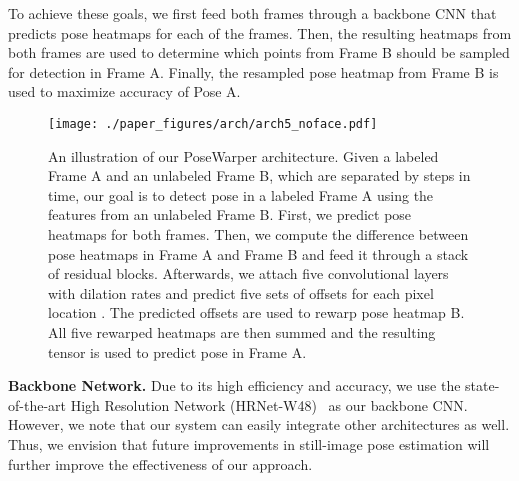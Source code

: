 \documentclass{article}
\begin{document}
To achieve these goals, we first feed both frames through a backbone CNN that predicts pose heatmaps for each of the frames. Then, the resulting heatmaps from both frames are used to determine which points from Frame B should be sampled for detection in Frame A. Finally, the resampled pose heatmap from Frame B is used to maximize accuracy of Pose A. 

















\begin{figure}
\begin{center}
   \texttt{[image: ./paper\_figures/arch/arch5\_noface.pdf]}
\end{center}
\vspace{-0.2cm}
\caption{An illustration of our PoseWarper architecture. Given a labeled Frame A and an unlabeled Frame B, which are separated by  steps in time, our goal is to detect pose in a labeled Frame A using the features from an unlabeled Frame B. First, we predict pose heatmaps for both frames. Then, we compute the difference between pose heatmaps in Frame A and Frame B and feed it through a stack of  residual blocks. Afterwards, we attach five  convolutional layers with dilation rates  and predict five sets of offsets  for each pixel location . The predicted offsets are used to rewarp pose heatmap B. All five rewarped heatmaps are then summed and the resulting tensor is used to predict pose in Frame A.\vspace{-0.5cm}} \label{arch_fig}
\end{figure}




\textbf{Backbone  Network.}  Due to its high efficiency and accuracy, we use the state-of-the-art High Resolution Network (HRNet-W48)~\cite{sun2019deep} as our backbone CNN. However, we note that our system can easily integrate other architectures as well. Thus, we envision that future improvements in still-image pose estimation will further improve the effectiveness of our approach. 
\end{document}
